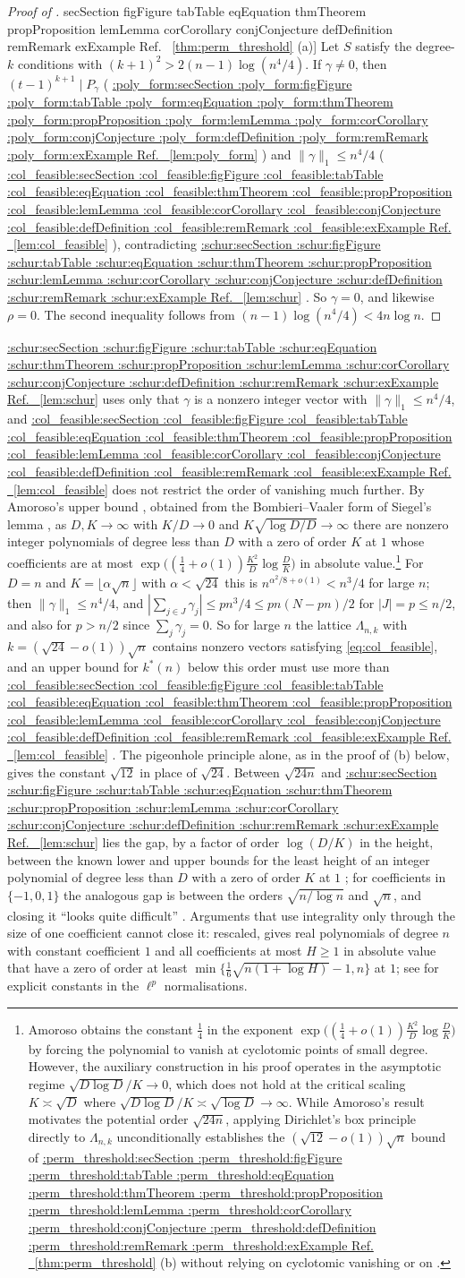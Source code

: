 \documentclass[11pt,a4paper]{article}
\makeatletter
\def\Cref@getprefix#1:#2\relax{#1}
\def\Cref@prefix@sec{sec}
\def\Cref@prefix@fig{fig}
\def\Cref@prefix@tab{tab}
\def\Cref@prefix@eq{eq}
\def\Cref@prefix@thm{thm}
\def\Cref@prefix@prop{prop}
\def\Cref@prefix@lem{lem}
\def\Cref@prefix@cor{cor}
\def\Cref@prefix@conj{conj}
\def\Cref@prefix@def{def}
\def\Cref@prefix@rem{rem}
\def\Cref@prefix@ex{ex}
\def\Cref@type@cap#1{%
  \edef\Cref@tmp{#1}%
  \ifx\Cref@tmp\Cref@prefix@sec Section%
  \else\ifx\Cref@tmp\Cref@prefix@fig Figure%
  \else\ifx\Cref@tmp\Cref@prefix@tab Table%
  \else\ifx\Cref@tmp\Cref@prefix@eq Equation%
  \else\ifx\Cref@tmp\Cref@prefix@thm Theorem%
  \else\ifx\Cref@tmp\Cref@prefix@prop Proposition%
  \else\ifx\Cref@tmp\Cref@prefix@lem Lemma%
  \else\ifx\Cref@tmp\Cref@prefix@cor Corollary%
  \else\ifx\Cref@tmp\Cref@prefix@conj Conjecture%
  \else\ifx\Cref@tmp\Cref@prefix@def Definition%
  \else\ifx\Cref@tmp\Cref@prefix@rem Remark%
  \else\ifx\Cref@tmp\Cref@prefix@ex Example%
  \else Ref.%
  \fi\fi\fi\fi\fi\fi\fi\fi\fi\fi\fi\fi
}
\DeclareRobustCommand{\Cref}[1]{%
  \begingroup
  \edef\Cref@label{#1}%
  \edef\Cref@prefix{\expandafter\Cref@getprefix\Cref@label:\relax}%
  \hyperref[#1]{\Cref@type@cap{\Cref@prefix}~\ref*{#1}}%
  \endgroup
}
\theoremstyle{plain}
\theoremstyle{definition}
\theoremstyle{remark}
\makeatother
\begin{document}
\begin{proof}[Proof of \Cref{thm:perm_threshold}(a)]
Let $S$ satisfy the degree-$k$ conditions with $(k+1)^2>2(n-1)\log(n^4/4)$.
If $\gamma\ne0$, then $(t-1)^{k+1}\mid P_\gamma$ (\Cref{lem:poly_form}) and $\|\gamma\|_1\le n^4/4$ (\Cref{lem:col_feasible}), contradicting \Cref{lem:schur}.
So $\gamma=0$, and likewise $\rho=0$.
The second inequality follows from $(n-1)\log(n^4/4)<4n\log n$.
\end{proof}

\Cref{lem:schur} uses only that $\gamma$ is a nonzero integer vector with $\|\gamma\|_1\le n^4/4$, and \Cref{lem:col_feasible} does not restrict the order of vanishing much further.
By Amoroso's upper bound \cite[Thm.~2]{amoroso1995}, obtained from the Bombieri--Vaaler form of Siegel's lemma \cite{bombieri1987low}, as $D,K\to\infty$ with $K/D\to0$ and $K\sqrt{\log D/D}\to\infty$ there are nonzero integer polynomials of degree less than $D$ with a zero of order $K$ at $1$ whose coefficients are at most $\exp\bigl((\frac14+o(1))\frac{K^2}D\log\frac DK\bigr)$ in absolute value.\footnote{Amoroso \cite[Thm.~2]{amoroso1995} obtains the constant $\frac14$ in the exponent $\exp\bigl((\frac14+o(1))\frac{K^2}D\log\frac DK\bigr)$ by forcing the polynomial to vanish at cyclotomic points of small degree. However, the auxiliary construction in his proof operates in the asymptotic regime $\sqrt{D\log D}/K\to0$, which does not hold at the critical scaling $K\asymp\sqrt D$ where $\sqrt{D\log D}/K\asymp\sqrt{\log D}\to\infty$. While Amoroso's result motivates the potential order $\sqrt{24n}$, applying Dirichlet's box principle directly to $\Lambda_{n,k}$ unconditionally establishes the $(\sqrt{12}-o(1))\sqrt n$ bound of \Cref{thm:perm_threshold}(b) without relying on cyclotomic vanishing or on \cite{amoroso1995}.}
For $D=n$ and $K=\lfloor\alpha\sqrt n\rfloor$ with $\alpha<\sqrt{24}$ this is $n^{\alpha^2/8+o(1)}<n^3/4$ for large $n$; then $\|\gamma\|_1\le n^4/4$, and $|\sum_{j\in J}\gamma_j|\le pn^3/4\le pn(N-pn)/2$ for $|J|=p\le n/2$, and also for $p>n/2$ since $\sum_j\gamma_j=0$.
So for large $n$ the lattice $\Lambda_{n,k}$ with $k=(\sqrt{24}-o(1))\sqrt n$ contains nonzero vectors satisfying \eqref{eq:col_feasible}, and an upper bound for $k^*(n)$ below this order must use more than \Cref{lem:col_feasible}.
The pigeonhole principle alone, as in the proof of (b) below, gives the constant $\sqrt{12}$ in place of $\sqrt{24}$.
Between $\sqrt{24n}$ and \Cref{lem:schur} lies the gap, by a factor of order $\log(D/K)$ in the height, between the known lower and upper bounds for the least height of an integer polynomial of degree less than $D$ with a zero of order $K$ at $1$ \cite{mignotte1982,bombieri1987low,amoroso1995}; for coefficients in $\{-1,0,1\}$ the analogous gap is between the orders $\sqrt{n/\log n}$ and $\sqrt n$, and closing it ``looks quite difficult'' \cite[Sect.~2]{BEK1999}.
Arguments that use integrality only through the size of one coefficient cannot close it: rescaled, \cite[Thm.~2.3]{BEK1999} gives real polynomials of degree $n$ with constant coefficient $1$ and all coefficients at most $H\ge1$ in absolute value that have a zero of order at least $\min\{\frac16\sqrt{n(1+\log H)}-1,n\}$ at $1$; see \cite[Thms.~2.1 and 2.2]{erdelyi2016} for explicit constants in the $\ell^p$ normalisations.
\end{document}
